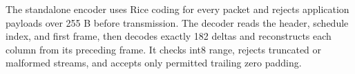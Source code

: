The standalone encoder uses Rice coding for every packet and rejects application payloads over 255 B before transmission. The decoder reads the header, schedule index, and first frame, then decodes exactly 182 deltas and reconstructs each column from its preceding frame. It checks int8 range, rejects truncated or malformed streams, and accepts only permitted trailing zero padding.
\endgroup
\FloatBarrier

